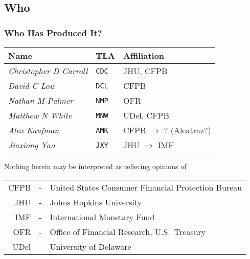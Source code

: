 \documentclass[public]{beamer}
\providecommand{\CDC}{\texttt{CDC}}
\providecommand{\NMP}{\texttt{NMP}}
\providecommand{\MNW}{\texttt{MNW}}
\providecommand{\DCL}{\texttt{DCL}}
\providecommand{\AMK}{\texttt{AMK}}
\begin{document}
\subsection{Who}
\begin{frame}
\frametitle{Who Has Produced It?}

\begin{footnotesize}
\begin{center}

\begin{tabular}{lll}
Name & TLA & Affiliation %
\\ \hline \hline {\it Christopher D Carroll} & \texttt{{\CDC}} & JHU, CFPB %
\\ {\it David C Low} & \texttt{{\DCL}} & CFPB %
\\ {\it Nathan M Palmer} & \texttt{{\NMP}} & OFR %
\\ {\it Matthew N White} & \texttt{{\MNW}} & UDel, CFPB %
\\ \hline {\it Alex Kaufman} & \texttt{{\AMK}} & CFPB $\rightarrow$ ? (Alcatraz?)  %
\\ {\it Jiaxiong Yao} & \texttt{JXY} & JHU $\rightarrow$ IMF  %
\end{tabular}
\end{center}


Nothing herein may be interpreted as reflecing opinions of 
\begin{center}
\begin{tabular}{rcl}
 CFPB & - & United States Consumer Financial Protection Bureau
\\ JHU & - & Johns Hopkins University
\\ IMF & - & International Monetary Fund
\\ OFR & - & Office of Financial Research, U.S.\ Treasury
\\ UDel & - & University of Delaware
\end{tabular}

\end{center}


\end{footnotesize}
\end{frame}
\end{document}
